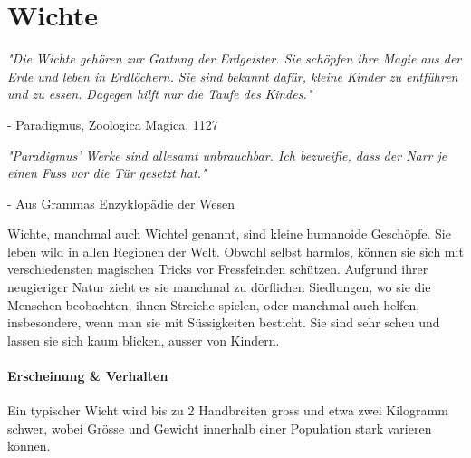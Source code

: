 \documentclass[12pt,twoside,twocolumn,openany]{book}
\begin{document}





\section{Wichte}
\begin{quotebox}
	\textit{"Die Wichte gehören zur Gattung der Erdgeister. Sie schöpfen ihre Magie aus der Erde und leben in Erdlöchern. Sie sind bekannt dafür, kleine Kinder zu entführen und zu essen. Dagegen hilft nur die Taufe des Kindes."}
	\begin{flushright}
		- Paradigmus, Zoologica Magica, 1127
	\end{flushright}
	
	\noindent\emph{"Paradigmus' Werke sind allesamt unbrauchbar. Ich bezweifle, dass der Narr je einen Fuss vor die Tür gesetzt hat."}
	\begin{flushright}
		- Aus Grammas Enzyklopädie der Wesen
	\end{flushright}
\end{quotebox}

Wichte, manchmal auch Wichtel genannt, sind kleine humanoide Geschöpfe. Sie leben wild in allen Regionen der Welt. Obwohl selbst harmlos, können sie sich mit verschiedensten magischen Tricks vor Fressfeinden schützen. Aufgrund ihrer neugieriger Natur zieht es sie manchmal zu dörflichen Siedlungen, wo sie die Menschen beobachten, ihnen Streiche spielen, oder manchmal auch helfen, insbesondere, wenn man sie mit Süssigkeiten besticht. Sie sind sehr scheu und lassen sie sich kaum blicken, ausser von Kindern.

\paragraph{Erscheinung \& Verhalten}
Ein typischer Wicht wird bis zu 2 Handbreiten gross und etwa zwei Kilogramm schwer, wobei Grösse und Gewicht innerhalb einer Population stark varieren können.
\end{document}
